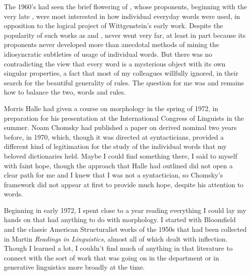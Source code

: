 \documentclass[output=paper]{langsci/langscibook}
\begin{document}
The 1960's had seen the brief flowering of ,
whose proponents, beginning with the very late %
\citet{Wittgenstein1953}%
%
, were
most interested in how individual everyday words were used, in
opposition to the logical project of Wittgenstein's early work. Despite
the popularity of such works as %
\citet{Austin1962} %
%
and %
\citet{Searle69}%
%
,
 never went very far, at least in part
because its proponents never developed more than anecdotal methods of
mining the idiosyncratic subtleties of usage of individual words. But
there was no contradicting the view that every word is a mysterious
object with its own singular properties, a fact that most of my
colleagues willfully ignored, in their search for the beautiful
generality of rules. The question for me was and remains how to balance
the two, words and rules.

\newpage 
Morris Halle had given a course on morphology in the spring of 1972, in
preparation for his presentation at the International Congress of
Linguists in the summer. Noam Chomsky had published a paper on derived
nominal two years before, in 1970, which, though it was directed at
syntacticians, provided a different kind of legitimation for the study
of the individual words that my beloved dictionaries held. Maybe I could
find something there, I said to myself with faint hope, though the
approach that Halle had outlined did not open a clear path for me and I
knew that I was not a syntactician, so Chomsky's framework did not
appear at first to provide much hope, despite his attention to words.

Beginning in early 1972, I spent close to a year reading everything I
could lay my hands on that had anything to do with morphology. I started
with Bloomfield and the classic American Structuralist works of the
1950s that had been collected in Martin %
%
\emph{Readings in
Linguistics}, almost all of which dealt with inflection. Though I
learned a lot, I couldn't find much of anything in that literature to
connect with the sort of work that was going on in the department or in
generative linguistics more broadly at the time.
\end{document}
